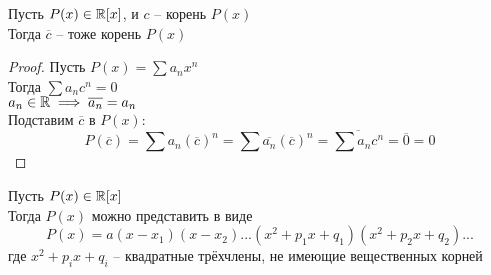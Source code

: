 \begin{lemma}
	Пусть $P(x) \in \mathbb{R}[x]$, и $c$ -- корень $P(x)$ \\
	Тогда $\overline{c}$ -- тоже корень $P(x)$
\end{lemma}

\begin{proof}
	Пусть $P(x) = \sum a_nx^n$ \\
	Тогда $\sum a_nc^n = 0$ \\
	$ a_n \in \mathbb{R} \implies \overline{a_n} = a_n$ \\
	Подставим $\overline{c}$ в $P(x)$:
	$$ P(\overline{c}) = \sum a_n (\overline{c})^n = \sum \overline{a_n}(\overline{c})^n = \overline{\sum a_nc^n} = \overline0 = 0 $$
\end{proof}

\begin{theorem}
	Пусть $P(x) \in \mathbb{R}[x]$ \\
	Тогда $P(x)$ можно представить в виде
	$$ P(x) = a(x - x_1)(x - x_2)...(x^2 + p_1x + q_1)(x^2 + p_2x + q_2)... $$
	где $x^2 + p_ix + q_i$ -- квадратные трёхчлены, не имеющие вещественных корней
\end{theorem}

